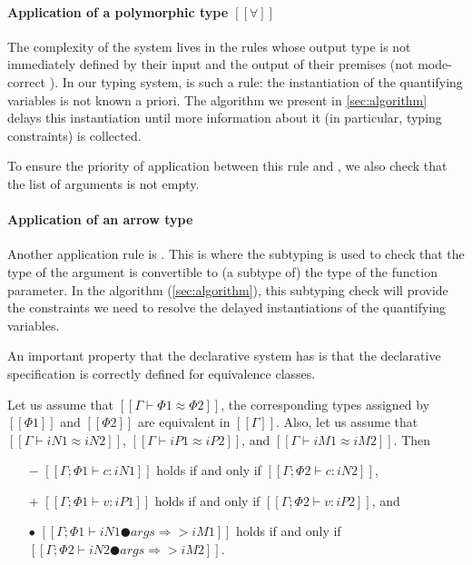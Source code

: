 \paragraph{Application of a polymorphic type $[[∀]]$}
  The complexity of the system lives in the rules whose output type is not
  immediately defined by their input and the output of their premises (\aka not
  mode-correct \cite{dunfield2020:bidirectional}). In our typing system,
   is such a rule: the instantiation of the
  quantifying variables is not known a priori. The algorithm we present in
  \cref{sec:algorithm} delays this instantiation until more information about it
  (in particular, typing constraints) is collected.

  To ensure the priority of application between this rule and 
  , we also check that 
  the list of arguments is not empty.

\paragraph{Application of an arrow type}
  Another application rule is .
  This is where the subtyping is used to check that the type of the argument
  is convertible to (a subtype of) the type of the function parameter.
  In the algorithm (\cref{sec:algorithm}), this subtyping check will provide the constraints
  we need to resolve the delayed instantiations of the quantifying variables.

  \vspace{\baselineskip}
  An important property that the declarative system has is
  that the declarative specification is correctly defined for
  equivalence classes.

\begin{property}
  Let us assume that $[[Γ ⊢ Φ1 ≈ Φ2]]$, \ie  
  the corresponding types assigned by $[[Φ1]]$ and
  $[[Φ2]]$ are equivalent in $[[Γ]]$.
  Also, let us assume that 
  $[[Γ ⊢ iN1 ≈ iN2]]$, $[[Γ ⊢ iP1 ≈ iP2]]$,
  and $[[Γ ⊢ iM1 ≈ iM2]]$. Then
  \begin{itemize}
    \item [$-$] $[[Γ ; Φ1 ⊢ c : iN1]]$ holds if and only if $[[Γ ; Φ2 ⊢ c : iN2]]$,
    \item [$+$] $[[Γ ; Φ1 ⊢ v : iP1]]$ holds if and only if $[[Γ ; Φ2 ⊢ v : iP2]]$, and
    \item [$\bullet$] $[[Γ; Φ1 ⊢ iN1 ● args ⇒> iM1]]$ holds if and only if $[[Γ; Φ2 ⊢ iN2 ● args ⇒> iM2]]$.
  \end{itemize}
\end{property}

